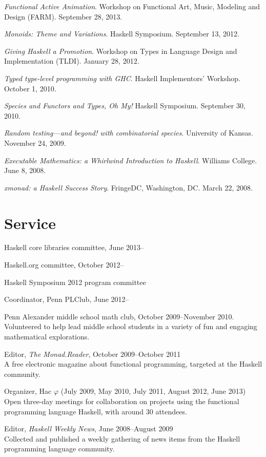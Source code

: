 \documentclass{article}
\newcommand{\cvitem}{\par\hangpara{2em}{1}}
\begin{document}
\cvitem \emph{Functional Active Animation}. Workshop on Functional
    Art, Music, Modeling and Design (FARM).  September 28, 2013.
\cvitem \emph{Monoids: Theme and Variations}. Haskell Symposium.
    September 13, 2012.
\cvitem \emph{Giving Haskell a Promotion}. Workshop on Types in
    Language Design and Implementation (TLDI). January 28, 2012.
\cvitem \emph{Typed type-level programming with GHC}. Haskell
    Implementors' Workshop. October 1, 2010.
\cvitem \emph{Species and Functors and Types, Oh My!} Haskell
    Symposium. September 30, 2010.
\cvitem \emph{Random testing---and beyond! with combinatorial
    species}. University of Kansas.  November 24, 2009.
\cvitem \emph{Executable Mathematics: a Whirlwind Introduction to
    Haskell}. Williams College.  June 8, 2008.
\cvitem \emph{xmonad: a Haskell Success Story}. FringeDC, Washington,
    DC. March 22, 2008.

\section*{Service}
\cvitem Haskell core libraries committee, June 2013--

\cvitem Haskell.org committee, October 2012--

\cvitem Haskell Symposium 2012 program committee

\cvitem Coordinator, Penn PLClub, June 2012--

\cvitem Penn Alexander middle school math club, October 2009--November
2010. \\
Volunteered to help lead middle school students in a variety of fun
and engaging mathematical explorations.

\cvitem Editor, \emph{The Monad.Reader}, October 2009--October 2011 \\
A free electronic magazine about functional programming, targeted at
the Haskell community.

\cvitem Organizer, Hac $\varphi$ (July 2009, May 2010, July 2011,
August 2012, June 2013) \\
Open three-day meetings for collaboration on projects using the functional
programming language Haskell, with around 30 attendees.

\cvitem Editor, \emph{Haskell Weekly News}, June 2008--August 2009 \\
Collected and published a weekly gathering of news items from the
Haskell programming language community.
\end{document}

